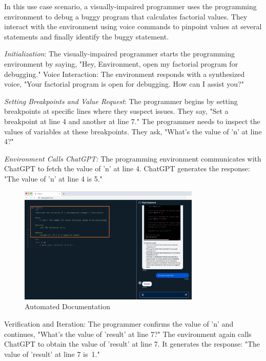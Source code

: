 In this use case scenario, a visually-impaired
programmer uses the programming environment to debug a buggy program
that calculates factorial values. They interact with the environment
using voice commands to pinpoint values at several statements and
finally identify the buggy statement.

{\em Initialization}: The visually-impaired programmer starts the
programming environment by saying, "Hey, Environment, open my
factorial program for debugging."  Voice Interaction: The environment
responds with a synthesized voice, "Your factorial program is open for
debugging. How can I assist you?"

{\em Setting Breakpoints and Value Request}: The programmer begins by
setting breakpoints at specific lines where they suspect issues. They
say, "Set a breakpoint at line 4 and another at line 7." The
programmer needs to inspect the values of variables at these
breakpoints. They ask, "What's the value of 'n' at line 4?"

{\em Environment Calls ChatGPT:} The programming environment
communicates with ChatGPT to fetch the value of 'n' at line 4.
ChatGPT generates the response: "The value of 'n' at line 4 is 5."

\begin{figure}
\centering
\includegraphics[width=3.4in]{p4h-7}
\vspace{-6pt}
\caption{Automated Documentation}
\label{auto-doc}
\end{figure}


Verification and Iteration: The programmer confirms the value of
'n' and continues, "What's the value of 'result' at line 7?"  The
environment again calls ChatGPT to obtain the value of 'result' at
line 7.  It generates the response: "The value of 'result' at
line 7 is~1."

